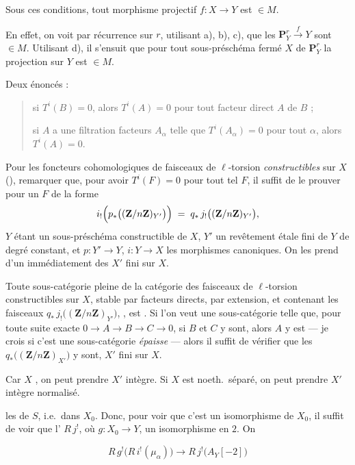 \documentclass[11pt,a4paper]{article}
\begin{document}
Sous ces conditions, tout morphisme  projectif $f : X \to Y$ est
$\in M$.

En effet, on voit par récurrence sur $r$, utilisant a), b), c), que les
$\mathbf{P}^{r}_{Y} \xrightarrow{\ f\ } Y$ sont $\in M$. Utilisant d), il
s'ensuit que pour tout sous-préschéma fermé $X$ de $\mathbf{P}^{r}_{Y}$
 la projection sur $Y$ est $\in M$.

Deux énoncés :
\begin{quote}
si $T^{i}(B) = 0$, alors $T^{i}(A) = 0$ pour tout facteur direct $A$ de $B$ ;

si $A$ a une filtration  \ill{} facteurs $A_{\alpha}$ telle que
$T^{i}(A_{\alpha}) = 0$ pour tout $\alpha$, alors $T^{i}(A) = 0$.
\end{quote}

Pour les foncteurs cohomologiques de faisceaux de $\ell$-torsion
\emph{constructibles} sur $X$ (\ill{}), \ill{} remarquer 
\ill{} que, pour avoir $T^{i}(F) = 0$ pour tout tel $F$, il suffit de le
prouver pour un $F$ de la forme
\[
  i_{!}\Bigl( p_{*}\bigl( (\mathbf{Z}/n\mathbf{Z})_{Y'} \bigr) \Bigr)
  \;=\; q_{*}\, j_{!}\bigl( (\mathbf{Z}/n\mathbf{Z})_{Y'} \bigr) ,
\]
$Y$ étant un sous-préschéma constructible de $X$, $Y'$ un revêtement étale
fini de $Y$ de degré constant, et $p : Y' \to Y$, $i : Y \to X$ les morphismes
canoniques. On les prend d'un \ill{} immédiatement des $X'$ fini sur $X$.


Toute sous-catégorie pleine de la catégorie des faisceaux de $\ell$-torsion
constructibles sur $X$, stable par facteurs directs, par extension, et
contenant les faisceaux
$q_{*}\, j_{!}\bigl( (\mathbf{Z}/n\mathbf{Z})_{Y'} \bigr)$, \ill{}, est
\ill{}. Si l'on veut une sous-catégorie \struck{\ill{}} telle que, pour toute
suite exacte $0 \to A \to B \to C \to 0$, si $B$ et $C$ y sont, alors $A$ y
est — je crois si c'est une sous-catégorie \emph{épaisse} — alors il suffit
de vérifier que les $q_{*}\bigl( (\mathbf{Z}/n\mathbf{Z})_{X'} \bigr)$ y
sont, $X'$ fini sur $X$.

Car $X$ \ill{}, on peut  prendre $X'$ intègre. Si $X$ est
\struck{\ill{}}  \ill{} noeth.\ séparé, on peut prendre $X'$
intègre normalisé.


 les \ill{} de $S$, i.e.\ dans $X_0$. Donc, pour voir que c'est
un isomorphisme \ill{} de $X_0$, il suffit de voir que l'\ill{} \ill{}
$R\, j^{!}$, où $g : X_0 \to Y$, \ill{} \ill{} un isomorphisme en $2$. On
\ill{}

\[
  R\, g^{!}\bigl( R\, i^{!}(\mu_{\alpha}) \bigr) \longrightarrow
  R\, j^{!}\bigl( A_Y[-2] \bigr)
\]


\end{document}
